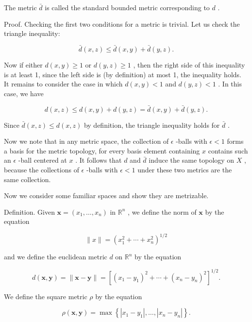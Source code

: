 The metric \(\bar{d}\) is called the standard bounded metric corresponding to \(d\) .

Proof. Checking the first two conditions for a metric is trivial. Let us check the triangle inequality:

\[
\bar{d}\left( {x,z}\right)  \leq  \bar{d}\left( {x,y}\right)  + \bar{d}\left( {y,z}\right) .
\]

Now if either \(d\left( {x,y}\right)  \geq  1\) or \(d\left( {y,z}\right)  \geq  1\) , then the right side of this inequality is at least 1, since the left side is (by definition) at most 1, the inequality holds. It remains to consider the case in which \(d\left( {x,y}\right)  < 1\) and \(d\left( {y,z}\right)  < 1\) . In this case, we have

\[
d\left( {x,z}\right)  \leq  d\left( {x,y}\right)  + d\left( {y,z}\right)  = \bar{d}\left( {x,y}\right)  + \bar{d}\left( {y,z}\right) .
\]

Since \(\bar{d}\left( {x,z}\right)  \leq  d\left( {x,z}\right)\) by definition, the triangle inequality holds for \(\bar{d}\) .

Now we note that in any metric space, the collection of \(\epsilon\) -balls with \(\epsilon  < 1\) forms a basis for the metric topology, for every basis element containing \(x\) contains such an \(\epsilon\) -ball centered at \(x\) . It follows that \(d\) and \(\bar{d}\) induce the same topology on \(X\) , because the collections of \(\epsilon\) -balls with \(\epsilon  < 1\) under these two metrics are the same collection.

Now we consider some familiar spaces and show they are metrizable.

Definition. Given \(\mathbf{x} = \left( {{x}_{1},\ldots ,{x}_{n}}\right)\) in \({\mathbb{R}}^{n}\) , we define the norm of \(\mathbf{x}\) by the equation

\[
\parallel x\parallel  = {\left( {x}_{1}^{2} + \cdots  + {x}_{n}^{2}\right) }^{1/2}
\]

and we define the euclidean metric \(d\) on \({\mathbb{R}}^{n}\) by the equation

\[
d\left( {\mathbf{x},\mathbf{y}}\right)  = \parallel \mathbf{x} - \mathbf{y}\parallel  = {\left\lbrack  {\left( {x}_{1} - {y}_{1}\right) }^{2} + \cdots  + {\left( {x}_{n} - {y}_{n}\right) }^{2}\right\rbrack  }^{1/2}.
\]

We define the square metric \(\rho\) by the equation

\[
\rho \left( {\mathbf{x},\mathbf{y}}\right)  = \max \left\{  {\left| {{x}_{1} - {y}_{1}}\right| ,\ldots ,\left| {{x}_{n} - {y}_{n}}\right| }\right\}  .
\]

